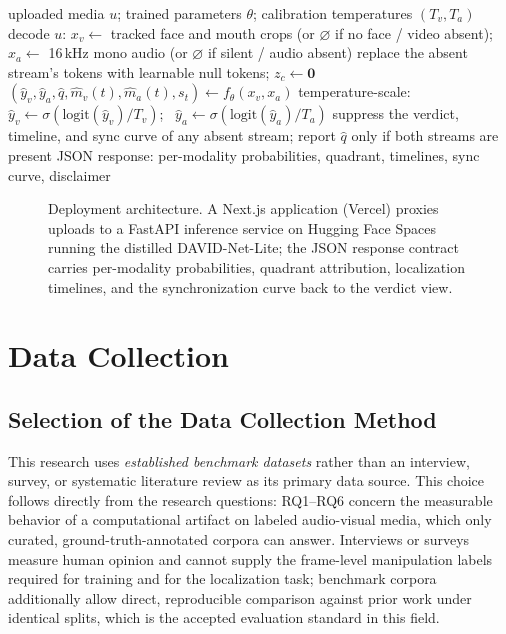 \begin{algorithm}[htbp]
\caption{Missing-modality-aware inference}
\label{alg:inference}
\begin{algorithmic}[1]
\Require uploaded media $u$; trained parameters $\theta$; calibration
  temperatures $(T_v, T_a)$
\State decode $u$: $x_v \gets$ tracked face and mouth crops (or $\varnothing$
  if no face / video absent); $x_a \gets$ 16\,kHz mono audio (or
  $\varnothing$ if silent / audio absent)
  \State replace the absent stream's tokens with learnable null tokens;
    $z_c \gets \mathbf{0}$
\EndIf
\State $(\hat{y}_v, \hat{y}_a, \hat{q}, \hat{m}_v(t), \hat{m}_a(t), s_t)
  \gets f_\theta(x_v, x_a)$
\State temperature-scale: $\hat{y}_v \gets \sigma(\mathrm{logit}(\hat{y}_v)/T_v)$;
  \ $\hat{y}_a \gets \sigma(\mathrm{logit}(\hat{y}_a)/T_a)$
\State suppress the verdict, timeline, and sync curve of any absent stream;
  report $\hat{q}$ only if both streams are present
\State \Return JSON response: per-modality probabilities, quadrant,
  timelines, sync curve, disclaimer
\end{algorithmic}
\end{algorithm}

\begin{figure}[htbp]
  \centering
  
  \caption{Deployment architecture. A Next.js application (Vercel) proxies
  uploads to a FastAPI inference service on Hugging Face Spaces running the
  distilled DAVID-Net-Lite; the JSON response contract carries per-modality
  probabilities, quadrant attribution, localization timelines, and the
  synchronization curve back to the verdict view.}
  \label{fig:deployment}
\end{figure}

\section{Data Collection}
\label{sec:data}

\subsection{Selection of the Data Collection Method}
This research uses \emph{established benchmark datasets} rather than an
interview, survey, or systematic literature review as its primary data source.
This choice follows directly from the research questions: RQ1--RQ6 concern the
measurable behavior of a computational artifact on labeled audio-visual media,
which only curated, ground-truth-annotated corpora can answer. Interviews or
surveys measure human opinion and cannot supply the frame-level manipulation
labels required for training and for the localization task; benchmark corpora
additionally allow direct, reproducible comparison against prior work under
identical splits, which is the accepted evaluation standard in this field.

